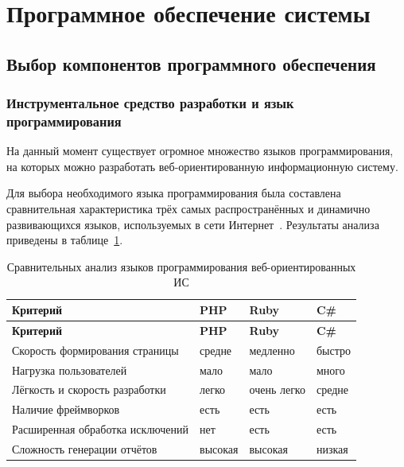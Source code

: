 \section{Программное обеспечение системы}


\subsection{Выбор компонентов программного обеспечения}

\subsubsection{Инструментальное средство разработки и язык программирования}

На данный момент существует огромное множество языков программирования, на которых можно разработать веб-ориентированную информационную систему.

Для выбора необходимого языка программирования была составлена сравнительная характеристика трёх самых распространённых и динамично развивающихся языков, используемых в сети Интернет~\cite{chikagosHub,leonardTeo}.
Результаты анализа приведены в таблице~\ref{tab:software-language}.

\begin{footnotesize}
\begin{longtable}[h]{|p{}|p{}|p{}|p{}|}
	\caption{\label{tab:software-language}Сравнительных анализ языков программирования веб-ориентированных ИС} \\
	\hline
		\textbf{Критерий} &
		\textbf{PHP} &
		\textbf{Ruby} &
		\textbf{C\#} \\
	\hline \endfirsthead
	\hline
		\textbf{Критерий} &
		\textbf{PHP} &
		\textbf{Ruby} &
		\textbf{C\#} \\
	\hline \endhead
	Скорость формирования страницы & 
	средне & медленно & быстро \\ \hline
	
	Нагрузка пользователей & 
	мало & мало & много \\ \hline
	
	Лёгкость и скорость разработки & 
	легко & очень легко & средне \\ \hline
	
	Наличие фреймворков & 
	есть & есть & есть \\ \hline
	
	Расширенная обработка исключений & 
	нет	& есть & есть \\ \hline
	
	Сложность генерации отчётов & 
	высокая & высокая & низкая \\ \hline
\end{longtable}
\end{footnotesize}

